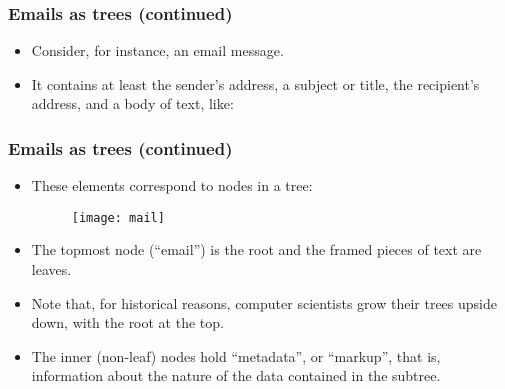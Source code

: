 \begin{frame}
  \frametitle{Emails as trees (continued)}

  \begin{itemize}

    \item Consider, for instance, an email message.

    \item It contains at least the sender's address, a subject or
      title, the recipient's address, and a body of text, like:
      \medskip
\begin{center}
\end{center}

  \end{itemize}

\end{frame}

\begin{frame}
  \frametitle{Emails as trees (continued)}

  \begin{itemize}

    \item These elements correspond to nodes in a tree:
      \begin{figure}
        \centering
        \texttt{[image: mail]}
      \end{figure}

    \item The topmost node (``email'') is the root and the framed
      pieces of text are leaves.

    \item Note that, for historical reasons, computer scientists grow
      their trees upside down, with the root at the top.

    \item The inner (non-leaf) nodes hold ``metadata'', or ``markup'',
      that is, information about the nature of the data contained in
      the subtree.

  \end{itemize}

\end{frame}
